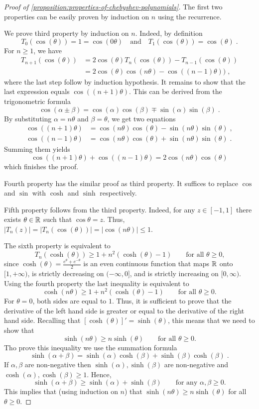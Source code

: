 \begin{proof}[Proof of \autoref{proposition:properties-of-chebyshev-polynomials}]
The first two properties can be easily proven by induction on $n$ using the recurrence.

We prove third property by induction on $n$. Indeed, by definition
$$
T_0(\cos(\theta)) = 1 = \cos(0 \theta) \quad \text{and} \quad T_1(\cos(\theta)) = \cos(\theta) \; .
$$
For $n \ge 1$, we have
\begin{align*}
T_{n+1}(\cos(\theta))
& = 2 \cos(\theta) T_n(\cos(\theta)) - T_{n-1}(\cos(\theta)) \\
& = 2 \cos(\theta) \cos(n \theta) - \cos((n-1)\theta)) \; ,
\end{align*}
where the last step follow by induction hypothesis.
It remains to show that the last expression equals $\cos((n+1)\theta)$.
This can be derived from the trigonometric formula
$$
\cos(\alpha \pm \beta) = \cos(\alpha) \cos(\beta) \mp \sin(\alpha) \sin(\beta) \; .
$$
By substituting $\alpha = n \theta$ and $\beta = \theta$, we get two equations
\begin{align*}
\cos((n+1) \theta) & = \cos(n \theta) \cos(\theta) - \sin(n \theta) \sin(\theta) \; , \\
\cos((n-1) \theta) & = \cos(n \theta) \cos(\theta) + \sin(n \theta) \sin(\theta) \; .
\end{align*}
Summing them yields
$$
\cos((n+1)\theta) + \cos((n-1) \theta) = 2 \cos(n \theta) \cos(\theta)
$$
which finishes the proof.

Fourth property has the similar proof as third property. It suffices
to replace $\cos$ and $\sin$ with $\cosh$ and $\sinh$ respectively.

Fifth property follows from the third property. Indeed, for any $z \in [-1,1]$
there exists $\theta \in \mathbb{R}$ such that $\cos \theta = z$. Thus, $|T_n(z)| =
|T_n(\cos(\theta))| = |\cos(n\theta)| \le 1$.

The sixth property is equivalent to
$$
T_n(\cosh(\theta)) \ge 1 + n^2 (\cosh(\theta) - 1) \qquad \text{for all $\theta \ge 0$,}
$$
since $\cosh(\theta) = \frac{e^{\theta} + e^{-\theta}}{2}$ is an even continuous
function that maps $\mathbb{R}$ onto $[1,+\infty)$, is strictly decreasing on
$(-\infty,0]$, and is strictly increasing on $[0,\infty)$. Using the fourth
property the last inequality is equivalent to
$$
\cosh(n \theta) \ge 1 + n^2 (\cosh(\theta) - 1) \qquad \text{for all $\theta \ge 0$.}
$$
For $\theta = 0$, both sides are equal to $1$. Thus, it is sufficient to prove
that the derivative of the left hand side is greater or equal to the derivative
of the right hand side. Recalling that $[\cosh(\theta)]' = \sinh(\theta)$, this
means that we need to show that
$$
\sinh(n \theta) \ge n \sinh(\theta) \qquad \text{for all $\theta \ge 0$.}
$$
Tho prove this inequality we use the summation formula
$$
\sinh(\alpha + \beta) = \sinh(\alpha) \cosh(\beta) + \sinh(\beta) \cosh(\beta) \; .
$$
If $\alpha, \beta$ are non-negative then $\sinh(\alpha), \sinh(\beta)$ are
non-negative and $\cosh(\alpha), \cosh(\beta) \ge 1$. Hence,
$$
\sinh(\alpha + \beta) \ge \sinh(\alpha) + \sinh(\beta) \qquad \text{for any $\alpha, \beta \ge 0$.}
$$
This implies that (using induction on $n$) that $\sinh(n \theta) \ge n
\sinh(\theta)$ for all $\theta \ge 0$.


\end{proof}

